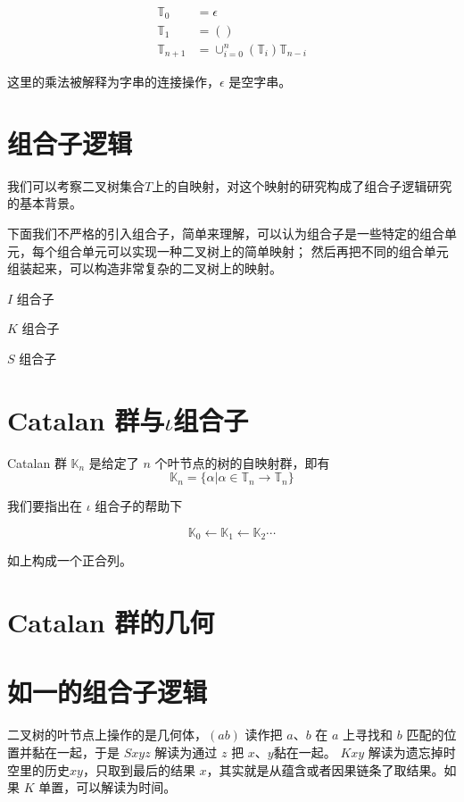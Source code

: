 \documentclass[a4paper,12pt]{article}
\numberwithin{definition}{section}
\numberwithin{lemma}{section}
\numberwithin{proposition}{section}
\numberwithin{theorem}{section}
\numberwithin{grammar}{section}
\numberwithin{program}{section}
\numberwithin{convention}{section}
\numberwithin{corollary}{section}
\numberwithin{principle}{section}
\begin{document}
\begin{align}
\mathbb{T}_0 & = {\epsilon} \\
\mathbb{T}_1 & = { () } \\
\mathbb{T}_{n+1} & = \cup_{i=0}^n (\mathbb{T}_i) \mathbb{T}_{n-i}
\end{align}

这里的乘法被解释为字串的连接操作，$\epsilon$ 是空字串。

\section{组合子逻辑}

我们可以考察二叉树集合$T$上的自映射，对这个映射的研究构成了组合子逻辑研究的基本背景。

下面我们不严格的引入组合子，简单来理解，可以认为组合子是一些特定的组合单元，每个组合单元可以实现一种二叉树上的简单映射；
然后再把不同的组合单元组装起来，可以构造非常复杂的二叉树上的映射。

$I$ 组合子


$K$ 组合子


$S$ 组合子



\section{Catalan 群与$\iota$组合子}

Catalan 群 $\mathbb{K}_n$ 是给定了 $n$ 个叶节点的树的自映射群，即有
$$
\mathbb{K}_n = \{ \alpha | \alpha \in \mathbb{T}_n \to \mathbb{T}_n \}
$$

我们要指出在 $\iota$ 组合子的帮助下

$$
\mathbb{K}_0 \leftarrow \mathbb{K}_1 \leftarrow \mathbb{K}_2 \cdots
$$

如上构成一个正合列。

\section{Catalan 群的几何}

\section{如一的组合子逻辑}

二叉树的叶节点上操作的是几何体，$(a b)$ 读作把 $a$、$b$ 在 $a$ 上寻找和 $b$ 匹配的位置并黏在一起，于是 $Sxyz$ 解读为通过 $z$ 把 $x$、$y$黏在一起。
$Kxy$ 解读为遗忘掉时空里的历史$xy$，只取到最后的结果 $x$，其实就是从蕴含或者因果链条了取结果。如果 $K$ 单置，可以解读为时间。
\end{document}
